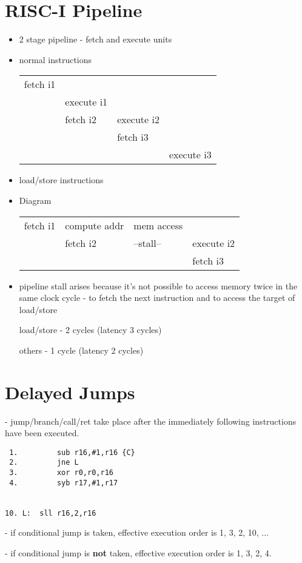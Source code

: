 \documentclass[a4paper,12pt]{article}
\begin{document}
\section*{RISC-I Pipeline}

\begin{itemize}

\item 2 stage pipeline - fetch and execute units

\item normal instructions \\


\begin{tabular}{l|l|l|l}
fetch i1		&					&					&					\\
				&	execute i1	&					&					\\
				&	fetch i2		&	execute i2	&					\\
				&					&	fetch i3		&					\\
				&					&					&	execute i3	\\
\end{tabular}

\item load/store instructions

\item Diagram

\begin{tabular}{l|l|l|l}
fetch i1		&	compute addr	& mem access	&					\\
				&	fetch i2			&	--stall--	&	execute i2	\\
				&						&					&	fetch i3		\\
\end{tabular}


\item pipeline stall arises because it's not possible to access memory
twice in the same clock cycle - to fetch the next instruction and to
access the target of load/store

\subitem load/store - 2 cycles (latency 3 cycles)

\subitem others - 1 cycle (latency 2 cycles)

\end{itemize}

\section*{Delayed Jumps}

- jump/branch/call/ret take place after the immediately following
  instructions have been executed.

\begin{verbatim}
 1. 		sub r16,#1,r16 {C}
 2. 		jne L
 3. 		xor r0,r0,r16
 4. 		syb r17,#1,r17


10. L:	sll r16,2,r16
\end{verbatim}

- if conditional jump is taken, effective execution order is 1, 3, 2,
  10, ...

- if conditional jump is \textbf{not} taken, effective execution order
  is 1, 3, 2, 4.
\end{document}
